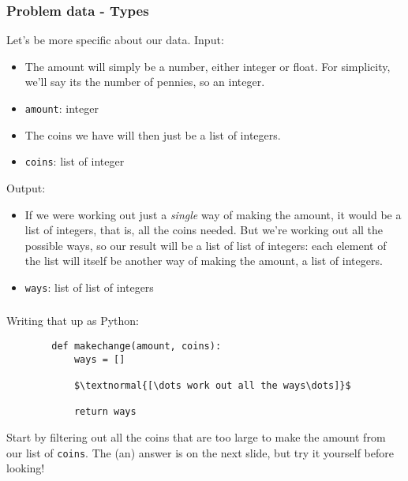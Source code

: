 \documentclass[handout]{beamer}
\begin{document}
	\begin{frame}[fragile]
		\frametitle{Problem data - Types}
		
		Let's be more specific about our data. Input:
		
		\begin{itemize}
			\item The amount will simply be a number, either integer or float. For simplicity, we'll say its the number of pennies, so an integer.
			\item \lstinline|amount|: integer \\
			\item The coins we have will then just be a list of integers.
			\item \lstinline|coins|: list of integer \\
		\end{itemize}
		
		Output:
		\begin{itemize}
			\item  If we were working out just a \emph{single} way of making the amount, it would be a list of integers, that is, all the coins needed. But we're working out all the possible ways, so our result will be a list of list of integers: each element of the list will itself be another way of making the amount, a list of integers.
			\item \lstinline|ways|: list of list of integers \\
		\end{itemize}
		
	\end{frame}
	
	
	\begin{frame}[fragile]
		\frametitle{}
		
		Writing that up as Python:
		
		\begin{lstlisting}
		def makechange(amount, coins):
		    ways = []
		
		    $\textnormal{[\dots work out all the ways\dots]}$
		
		    return ways
		\end{lstlisting}
		
		Start by filtering out all the coins that are too large to make the amount from our list of \lstinline|coins|. The (an) answer is on the next slide, but try it yourself before looking!
	\end{frame}
	
\end{document}
